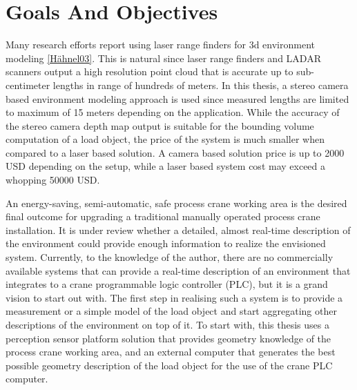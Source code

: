 \documentclass[12pt,a4paper,oneside,pdftex]{report}
\begin{document}
\section{Goals And Objectives}
\label{section:goals_and_objectives}

Many research efforts report using laser range finders for 3d environment modeling \ref{Hähnel03}. This is natural since laser range finders and LADAR scanners output a high resolution point cloud that is accurate up to sub-centimeter lengths in range of hundreds of meters. In this thesis, a stereo camera based environment modeling approach is used since measured lengths are limited to maximum of 15 meters depending on the application. While the accuracy of the stereo camera depth map output is suitable for the bounding volume computation of a load object, the price of the system is much smaller when compared to a laser based solution. A camera based solution price is up to 2000 USD depending on the setup, while a laser based system cost may exceed a whopping 50000 USD.


An energy-saving, semi-automatic, safe process crane working area is the desired final outcome for upgrading a traditional manually operated process crane installation. It is under review whether a detailed, almost real-time description of the environment could provide enough information to realize the envisioned system. Currently, to the knowledge of the author, there are no commercially available systems that can provide a real-time description of an environment that integrates to a crane programmable logic controller (PLC), but it is a grand vision to start out with. The first step in realising such a system is to provide a measurement or a simple model of the load object and start aggregating other descriptions of the environment on top of it. To start with, this thesis uses a perception sensor platform solution that provides geometry knowledge of the process crane working area, and an external computer that generates the best possible geometry description of the load object for the use of the crane PLC computer. 




\end{document}
